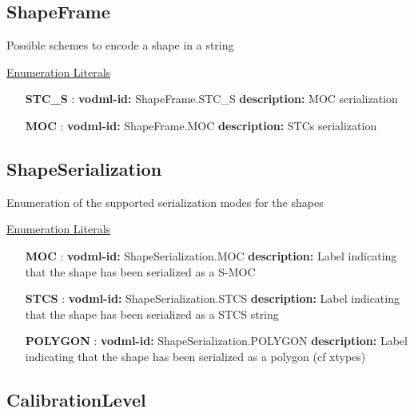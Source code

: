   \subsection{ShapeFrame}
  \label{sect:ShapeFrame}

  Possible schemes to encode a shape in a string

  \noindent \underline{Enumeration Literals}
  \vspace{-\parsep}
  \small
  \begin{itemize}
  
    \item[\textbf{STC\_S}]: \textbf{vodml-id:} ShapeFrame.STC\_S \newline
          \textbf{description:} MOC serialization
    \item[\textbf{MOC}]: \textbf{vodml-id:} ShapeFrame.MOC \newline
          \textbf{description:} STCs serialization
  \end{itemize}
  \normalsize


  \subsection{ShapeSerialization}
  \label{sect:ShapeSerialization}

  Enumeration of the supported serialization modes for the shapes

  \noindent \underline{Enumeration Literals}
  \vspace{-\parsep}
  \small
  \begin{itemize}
  
    \item[\textbf{MOC}]: \textbf{vodml-id:} ShapeSerialization.MOC \newline
          \textbf{description:} Label indicating that the shape has been serialized as a S-MOC
    \item[\textbf{STCS}]: \textbf{vodml-id:} ShapeSerialization.STCS \newline
          \textbf{description:} Label indicating that the shape has been serialized as a STCS string
    \item[\textbf{POLYGON}]: \textbf{vodml-id:} ShapeSerialization.POLYGON \newline
          \textbf{description:} Label indicating that the shape has been serialized as a polygon (cf xtypes)
  \end{itemize}
  \normalsize


  \subsection{CalibrationLevel}
  \label{sect:CalibrationLevel}

